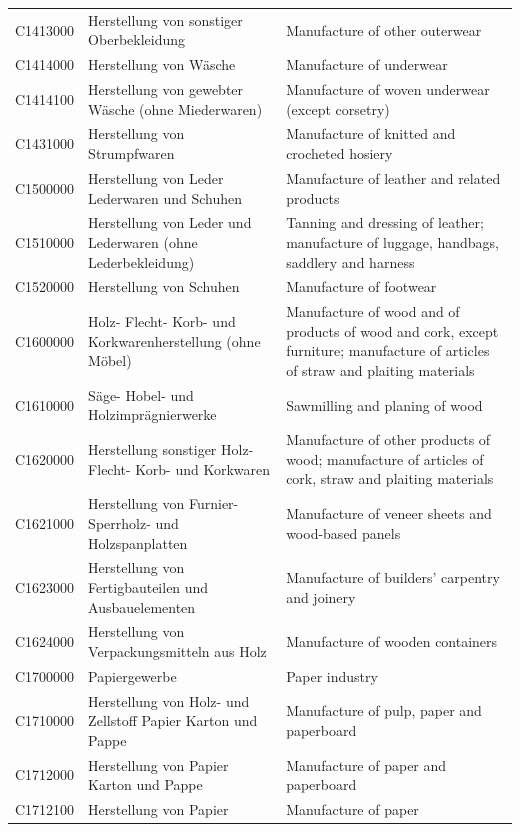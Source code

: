 \begin{longtable}{|p{3cm}|p{6cm}|p{6cm}|}
 C1413000   & Herstellung von sonstiger Oberbekleidung   & Manufacture of other outerwear    \\
 C1414000   & Herstellung von Wäsche   & Manufacture of underwear    \\
 C1414100   & Herstellung von gewebter Wäsche (ohne Miederwaren)   & Manufacture of woven underwear (except corsetry)    \\
 C1431000   & Herstellung von Strumpfwaren   & Manufacture of knitted and crocheted hosiery    \\
 C1500000   & Herstellung von Leder Lederwaren und Schuhen   & Manufacture of leather and related products    \\
 C1510000   & Herstellung von Leder und Lederwaren (ohne Lederbekleidung)   & Tanning and dressing of leather; manufacture of luggage, handbags, saddlery and harness    \\
 C1520000   & Herstellung von Schuhen   & Manufacture of footwear    \\
 C1600000   & Holz- Flecht- Korb- und Korkwarenherstellung (ohne Möbel)   & Manufacture of wood and of products of wood and cork, except furniture; manufacture of articles of straw and plaiting materials    \\
 C1610000   & Säge- Hobel- und Holzimprägnierwerke   & Sawmilling and planing of wood    \\
 C1620000   & Herstellung sonstiger Holz- Flecht- Korb- und Korkwaren   & Manufacture of other products of wood; manufacture of articles of cork, straw and plaiting materials    \\
 C1621000   & Herstellung von Furnier- Sperrholz- und Holzspanplatten   & Manufacture of veneer sheets and wood-based panels    \\
 C1623000   & Herstellung von Fertigbauteilen und Ausbauelementen   & Manufacture of builders' carpentry and joinery    \\
 C1624000   & Herstellung von Verpackungsmitteln aus Holz   & Manufacture of wooden containers    \\
 C1700000   & Papiergewerbe   & Paper industry    \\
 C1710000   & Herstellung von Holz- und Zellstoff Papier Karton und Pappe   & Manufacture of pulp, paper and paperboard    \\
 C1712000   & Herstellung von Papier Karton und Pappe   & Manufacture of paper and paperboard    \\
 C1712100   & Herstellung von Papier   & Manufacture of paper    \\

\end{longtable}
